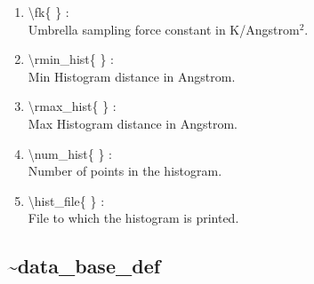 \documentclass[12pt,titlepage]{article}
\begin{document}
\begin{enumerate}
 \vspace{0.15in} 
 \item  \textbackslash fk\{ \} : \\               
    Umbrella sampling force constant in K/Angstrom$^2$.

 \vspace{0.15in} 
 \item  \textbackslash rmin\_hist\{ \} : \\         
    Min Histogram distance in Angstrom.

 \vspace{0.15in} 
 \item  \textbackslash rmax\_hist\{ \} : \\         
    Max Histogram distance in Angstrom.

 \vspace{0.15in} 
 \item  \textbackslash num\_hist\{ \} : \\         
    Number of points in the histogram.
 
 \vspace{0.15in} 
 \item  \textbackslash hist\_file\{ \} : \\        
    File to which the histogram is printed.

\end{enumerate}

\newpage
\subsection*{\bf \~{}data\_base\_def}
\end{document}
